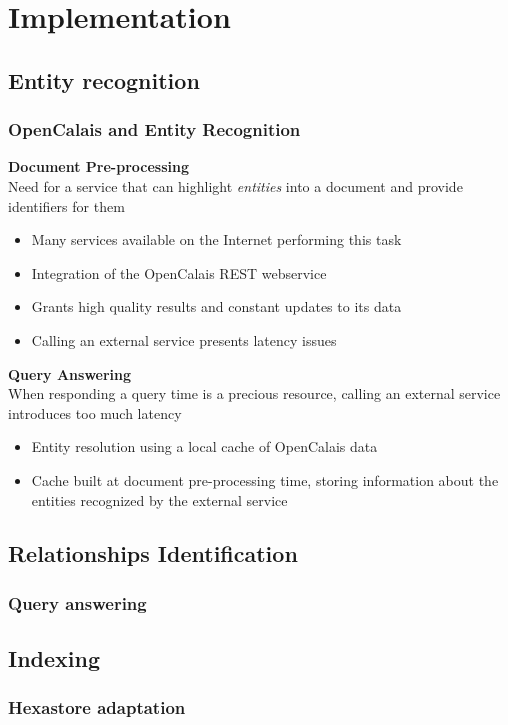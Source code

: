 \documentclass{beamer}
\begin{document}
\section{Implementation}
\subsection{Entity recognition}

\begin{frame}
\frametitle{OpenCalais and Entity Recognition}
{\color{red}\bfseries{Document Pre-processing}}\\
Need for a service that can highlight \emph{entities} into a document
and provide identifiers for them
\begin{itemize}
\item Many services available on the Internet performing this task
\item Integration of the OpenCalais REST webservice
\item Grants high quality results and constant updates to its data
\item Calling an external service presents latency issues
\end{itemize}
\vspace{2mm}
{\color{red}\bfseries{Query Answering}}\\
When responding a query time is a precious resource, calling an
external service introduces too much latency
\begin{itemize}
\item Entity resolution using a local cache of OpenCalais data
\item Cache built at document pre-processing time, storing information
  about the entities recognized by the external service
\end{itemize}
\end{frame}

\subsection{Relationships Identification}

\begin{frame}
\frametitle{Query answering}
\end{frame}

\subsection{Indexing}

\begin{frame}
\frametitle{Hexastore adaptation}
\end{frame}
\end{document}
